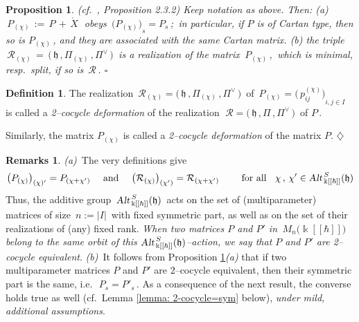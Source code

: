\documentclass[12pt,reqno,twoside,a4paper]{amsart}
\numberwithin{equation}{section}
\newtheorem{prop}[lema]{Proposition}
\theoremstyle{definition}
\newtheorem{definition}[lema]{Definition}
\newtheorem{rmks}[lema]{Remarks}
\newtheorem{free text}[lema]{}
\theoremstyle{remark}
\newcommand{\R}{{\mathcal R}}
\def \kh{{\Bbbk[[\hbar]]}}
\def \lieh{\mathfrak{h}}
\theoremstyle{plain}
\begin{document}
\begin{prop}  \label{prop: 2cocdef-realiz}
  \textsl{(cf.\ \cite{GG3}, Proposition 2.3.2)}
%
 Keep notation as above. Then:
%
 \vskip5pt
%
   (a)\;  $ \, P_{(\chi)} \, := \, P \, + \, \mathring{X} \; $  obeys  $ \, {\big( P_{(\chi)} \big)}_s = P_s \, $;
   \,in particular, if  $ P $  is of Cartan type, then so is  $ P_{(\chi)} \, $,
   and they are associated with the same Cartan matrix.
%
 \vskip5pt
%
   (b)\;  the triple  $ \, \R_{(\chi)} \, = \, \big(\, \lieh \, , \Pi_{(\chi)} \, , \Pi^\vee \,\big) \, $
   is a realization of the matrix  $ \, P_{(\chi)} \, $,  \,which is minimal, resp.\ split, if so is  $ \, \R \, $.   \hfill  $ \square $
%
\end{prop}

\vskip7pt

\begin{definition}\label{def:2-cocycle-realization}
%
 The realization  $ \, \R_{(\chi)} = \big(\, \lieh \, , \Pi_{(\chi)} \, , \Pi^\vee \,\big) \, $  of
 $ \, P_{(\chi)} = {\big(\, p^{(\chi)}_{i{}j} \big)}_{\!i, j \in I} \, $  is called a
 \textit{2--cocycle deformation\/}  of the realization
 $ \; \R = \big(\, \lieh \, , \Pi \, , \Pi^\vee \,\big) \, $  of  $ P \, $.
                                                                    \par
   Similarly, the matrix  $ P_{(\chi)} $  is called a  \textit{2--cocycle deformation\/}  of the matrix  $ P $.   \hfill  $ \diamondsuit $
%

%
\end{definition}

\vskip7pt

\begin{rmks}  \label{rmks: cocycle-deform-realiz}
%
 \textit{(a)}\,  The very definitions give
%
  $$  \big(P_{(\chi)}\big)_{(\chi)'} = P_{(\chi + \chi')}  \quad \text{ and }  \quad
  \big(\R_{(\chi)}\big)_{(\chi')} = \R_{(\chi + \chi')}  \qquad  \text{ for all }
  \;\;  \chi \, , \, \chi' \in \text{\sl Alt}_{\,\kh}^{\,S}(\lieh)  $$
%
 Thus, the additive group  $ \, \text{\sl Alt}_{\,\kh}^{\,S}(\lieh) \, $  acts on the set of
 (multiparameter) matrices of size  $ \, n := |I| \, $
 with fixed symmetric part, as well as on the set of their realizations of (any) fixed rank.
 \textsl{When two matrices  $ P $  and  $ P' $  in  $ \, M_n\big(\kh\big) \, $
 belong to the same orbit of this  $ \text{\sl Alt}_{\,\kh}^{\,S}(\lieh) $--action,
 we say that  \textit{$ P $  and  $ P' $  are 2--cocycle equivalent}}.
%
 \vskip5pt
%
   \textit{(b)}\,  It follows from  Proposition \ref{prop: 2cocdef-realiz}\textit{(a)\/}
   that if two multiparameter matrices  $ P $  and  $ P' $  are  $ 2 $--cocycle  equivalent,
   then their symmetric part is the same, i.e.\  $ \, P_s = P'_s \, $.
   As a consequence of the next result, the converse holds true as well
   (cf.\  Lemma \ref{lemma: 2-cocycle=sym}  below),  \textit{under mild, additional assumptions}.
%
\end{rmks}
\end{document}
